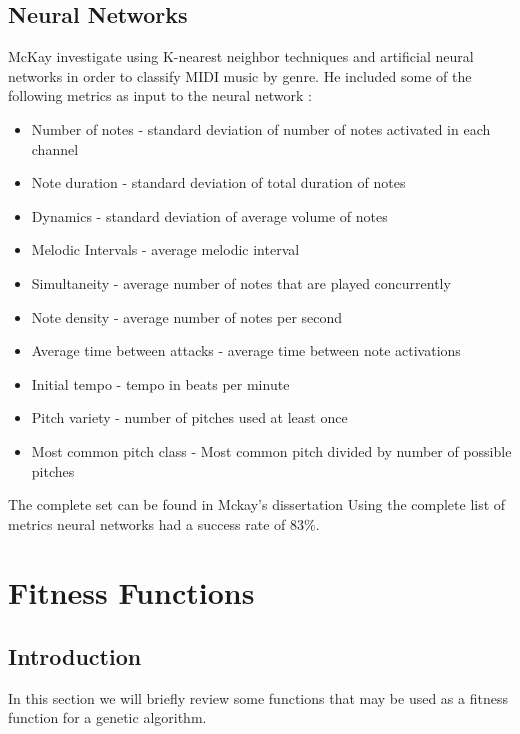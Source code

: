 \section{Neural Networks}
McKay investigate using K-nearest neighbor techniques and artificial neural networks in order to classify \ac{MIDI} music by genre.
He included some of the following metrics as input to the neural network \cite{Mckay2004}:
\begin{itemize}
\item Number of notes - standard deviation of number of notes activated in each channel
\item Note duration - standard deviation of total duration of notes
\item Dynamics - standard deviation of average volume of notes
\item Melodic Intervals - average melodic interval
\item Simultaneity - average number of notes that are played concurrently
\item Note density - average number of notes per second
\item Average time between attacks - average time between note activations
\item Initial tempo - tempo in beats per minute
\item Pitch variety - number of pitches used at least once
\item Most common pitch class - Most common pitch divided by number of possible pitches
\end{itemize}
The complete set can be found in Mckay's dissertation \cite{Mckay2004}
Using the complete list of metrics neural networks had a success rate of $83\%$.

\chapter{Fitness Functions}\label{sec:chapfitness}


\section{Introduction}
In this section we will briefly review some functions that may be used as a fitness function for a genetic algorithm.


